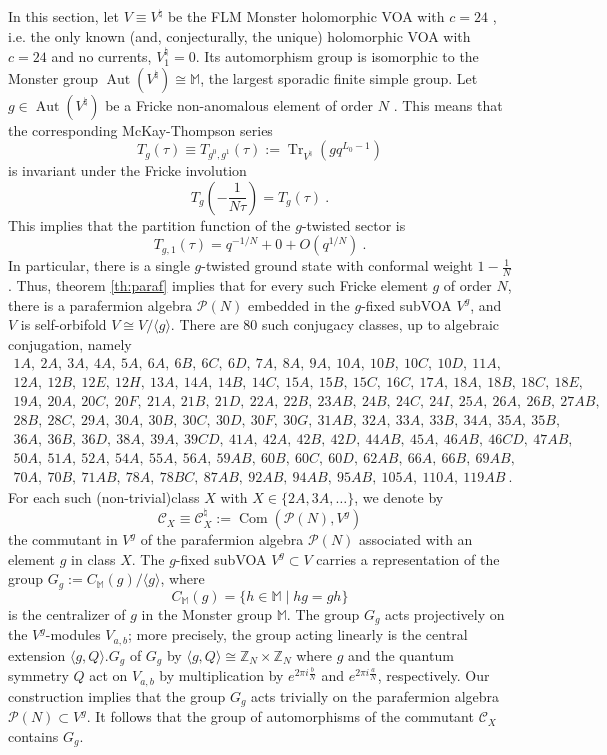 \documentclass[11pt,reqno]{article}
\newcommand{\be}{\begin{equation}}
\newcommand{\ee}{\end{equation}}
\newcommand{\calC}{\mathcal{C}}
\DeclareMathOperator{\Tr}{Tr}
\DeclareMathOperator{\Aut}{Aut}
\DeclareMathOperator{\Com}{Com}
\newcommand{\ZZ}{\mathbb{Z}}
\newcommand{\MM}{\mathbb{M}}
\newcommand{\paraf}{\mathcal{P}}
\begin{document}
In this section, let $V\equiv V^\natural$ be the FLM Monster holomorphic VOA with $c=24$  \cite{FLM1988}, i.e. the only known (and, conjecturally, the unique) holomorphic VOA with $c=24$ and no currents, $V^\natural_1=0$. Its automorphism group is isomorphic to the Monster group $\Aut(V^\natural)\cong \mathbb{M}$, the largest sporadic finite simple group.  Let $g\in \Aut(V^\natural)$ be a Fricke non-anomalous element of order $N$ \cite{ConwayNorton1979}. This means that the corresponding McKay-Thompson series
\be T_g(\tau)\equiv T_{g^0,g^1}(\tau):=\Tr_{V^\natural}(gq^{L_0-1})
\ee is invariant under the  Fricke involution
\be T_g(-\frac{1}{N\tau})=T_g(\tau)\ .
\ee This implies that the partition function of the $g$-twisted sector is
\be T_{g,1}(\tau)=q^{-1/N}+0+O(q^{1/N})\ .
\ee In particular, there is a single $g$-twisted ground state with conformal weight $1-\frac{1}{N}$. Thus, theorem \ref{th:paraf} implies that for every such Fricke element $g$ of order $N$, there is a parafermion algebra $\paraf(N)$ embedded in the $g$-fixed subVOA $V^g$, and $V$ is self-orbifold $V\cong V/\langle g\rangle$. There are $80$ such conjugacy classes, up to algebraic conjugation, namely
\begin{multline}
1A,\ 2A,\ 3A,\ 4A,\ 5A,\ 6A,\ 6B,\ 6C,\ 6D,\ 7A,\ 8A,\ 9A,\ 10A,\ 10B,\ 10C,\ 10D,\ 11A,\\ 
12A,\ 12B,\ 12E,\ 12H,\ 13A,\ 14A,\ 14B,\ 14C,\ 15A,\ 15B,\ 15C,\ 16C,\ 17A,\ 18A,\ 18B,\ 18C,\ 18E,\\ 19A,\ 20A,\ 20C,\ 20F,\ 21A,\ 21B,\ 21D,\ 22A,\ 22B,\ 23AB,\ 24B,\ 24C,\ 24I,\ 25A,\ 26A,\ 26B,\ 27AB,\\ 28B,\ 28C,\ 29A,\ 30A,\ 30B,\ 30C,\ 30D,\ 30F,\ 30G,\ 31AB,\ 32A,\ 33A,\ 33B,\ 34A,\ 35A,\ 35B,\\ 36A,\ 36B,\ 36D,\ 38A,\ 39A,\ 39CD,\ 41A,\ 42A,\ 42B,\ 42D,\ 44AB,\ 45A,\ 46AB,\ 46CD,\ 47AB,\\ 50A,\ 51A,\ 52A,\ 54A,\ 55A,\ 56A,\ 59AB,\ 60B,\ 60C,\ 60D,\ 62AB,\ 66A,\ 66B,\ 69AB,\\ 70A,\ 70B,\ 71AB,\ 78A,\ 78BC,\ 87AB,\ 92AB,\ 94AB,\ 95AB,\ 105A,\ 110A,\ 119AB\ .
\end{multline}
For each such (non-trivial)class $X$ with $X\in\{2A,3A,\ldots\}$, we denote by
\be \calC_X\equiv \calC_X^\natural:=\Com(\paraf(N),V^g)
\ee the commutant in $V^g$ of the parafermion algebra $\paraf(N)$ associated with an element $g$ in class $X$.
The $g$-fixed subVOA $V^g\subset V$ carries a representation of the group $G_g:=C_{\MM}(g)/\langle g\rangle$, where 
\be C_{\MM}(g)=\{h\in \MM\mid hg=gh\}
\ee is the centralizer of $g$ in the Monster group $\MM$. The group $G_g$ acts projectively on the $V^g$-modules $V_{a,b}$; more precisely, the group acting linearly is the central extension $\langle g,Q\rangle.G_g$ of $G_g$ by $\langle g,Q\rangle\cong \ZZ_N\times \ZZ_N$ where $g$ and the quantum symmetry $Q$ act on $V_{a,b}$ by multiplication by $e^{2\pi i\frac{b}{N}}$ and $e^{2\pi i\frac{a}{N}}$, respectively. Our construction implies that the group $G_g$ acts trivially on the parafermion algebra $\paraf(N)\subset V^g$. It follows that the group of automorphisms of the commutant $\calC_X$ contains $G_g$. 
\end{document}
